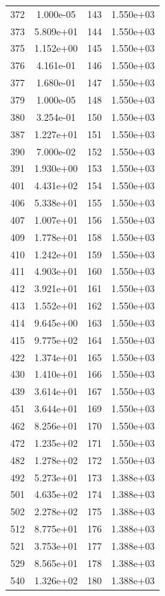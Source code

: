 \documentclass[12pt]{article}
\begin{document}
\begin{longtable}{@{}cccc@{}}
372 & 1.000e-05 & 143 & 1.550e+03 \\
373 & 5.809e+01 & 144 & 1.550e+03 \\
375 & 1.152e+00 & 145 & 1.550e+03 \\
376 & 4.161e-01 & 146 & 1.550e+03 \\
377 & 1.680e-01 & 147 & 1.550e+03 \\
379 & 1.000e-05 & 148 & 1.550e+03 \\
380 & 3.254e-01 & 150 & 1.550e+03 \\
387 & 1.227e+01 & 151 & 1.550e+03 \\
390 & 7.000e-02 & 152 & 1.550e+03 \\
391 & 1.930e+00 & 153 & 1.550e+03 \\
401 & 4.431e+02 & 154 & 1.550e+03 \\
406 & 5.338e+01 & 155 & 1.550e+03 \\
407 & 1.007e+01 & 156 & 1.550e+03 \\
409 & 1.778e+01 & 158 & 1.550e+03 \\
410 & 1.242e+01 & 159 & 1.550e+03 \\
411 & 4.903e+01 & 160 & 1.550e+03 \\
412 & 3.921e+01 & 161 & 1.550e+03 \\
413 & 1.552e+01 & 162 & 1.550e+03 \\
414 & 9.645e+00 & 163 & 1.550e+03 \\
415 & 9.775e+02 & 164 & 1.550e+03 \\
422 & 1.374e+01 & 165 & 1.550e+03 \\
430 & 1.410e+01 & 166 & 1.550e+03 \\
439 & 3.614e+01 & 167 & 1.550e+03 \\
451 & 3.644e+01 & 169 & 1.550e+03 \\
462 & 8.256e+01 & 170 & 1.550e+03 \\
472 & 1.235e+02 & 171 & 1.550e+03 \\
482 & 1.278e+02 & 172 & 1.550e+03 \\
492 & 5.273e+01 & 173 & 1.388e+03 \\
501 & 4.635e+02 & 174 & 1.388e+03 \\
502 & 2.278e+02 & 175 & 1.388e+03 \\
512 & 8.775e+01 & 176 & 1.388e+03 \\
521 & 3.753e+01 & 177 & 1.388e+03 \\
529 & 8.565e+01 & 178 & 1.388e+03 \\
540 & 1.326e+02 & 180 & 1.388e+03 \\

\end{longtable}
\end{document}
